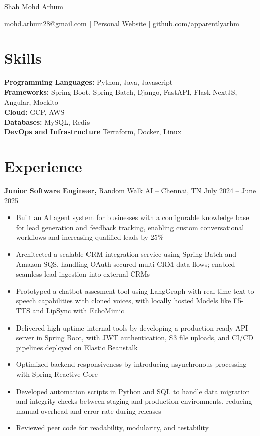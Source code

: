 \documentclass[11pt]{article}       %
\begin{document}
\centerline{\Huge Shah Mohd Arhum}

\vspace{5pt}

\centerline{\href{mailto:mohd.arhum28@gmail.com}{mohd.arhum28@gmail.com} | \href{https://arhm.dev/}{Personal Website} | \href{https://github.com/apparentlyarhm}{github.com/apparentlyarhm}}

\vspace{-10pt}

\section*{Skills}
\textbf{Programming Languages:} Python, Java, Javascript \\
\textbf{Frameworks:} Spring Boot, Spring Batch, Django, FastAPI, Flask NextJS, Angular, Mockito \\
\textbf{Cloud:} GCP, AWS \\
\textbf{Databases:} MySQL, Redis \\
\textbf{DevOps and Infrastructure} Terraform, Docker, Linux

\vspace{-6.5pt}

\section*{Experience}
\textbf{Junior Software Engineer,} {Random Walk AI} -- Chennai, TN \hfill July 2024 -- June 2025 \\
\vspace{-9pt}
\begin{itemize}
    \item Built an AI agent system for businesses with a configurable knowledge base for lead generation and feedback tracking, enabling custom conversational workflows and increasing qualified leads by 25\%
    \item Architected a scalable CRM integration service using Spring Batch and Amazon SQS, handling OAuth-secured multi-CRM data flows; enabled seamless lead ingestion into external CRMs
    \item Prototyped a chatbot assesment tool using LangGraph with real-time text to speech capabilities with cloned voices, with locally hosted Models like F5-TTS and LipSync with EchoMimic
    \item Delivered high-uptime internal tools by developing a production-ready API server in Spring Boot, with JWT authentication, S3 file uploads, and CI/CD pipelines deployed on Elastic Beanstalk    \item Optimized backend responsiveness by introducing asynchronous processing with Spring Reactive Core 
    \item Developed automation scripts in Python and SQL to handle data migration and integrity checks between staging and production environments, reducing manual overhead and error rate during releases
    \item Reviewed peer code for readability, modularity, and testability

\end{itemize}
\end{document}
